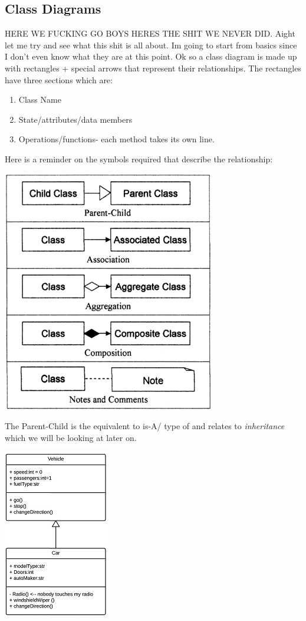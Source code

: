 \documentclass{article}
\begin{document}
\subsection{Class Diagrams}

HERE WE FUCKING GO BOYS HERES THE SHIT WE NEVER DID. Aight let me try and see what this shit is 
all about. Im going to start from basics since I don't even know what they are at this point.
Ok so a class diagram is made up with rectangles + special arrows that represent their 
relationships. The rectangles have three sections which are:

\begin{enumerate}
\item Class Name
\item State/attributes/data members
\item Operations/functions- each method takes its own line.
\end{enumerate}

Here is a reminder on the symbols required that describe the relationship:
\newline
\begin{center}
\includegraphics[scale=0.5]{classdiagram.png}
\end{center}

The Parent-Child is the equivalent to is-A/ type of and relates to \emph{inheritance} which we will
be looking at later on.

\begin{center}
\includegraphics{inheritancecd.png}
\end{center}
\end{document}
